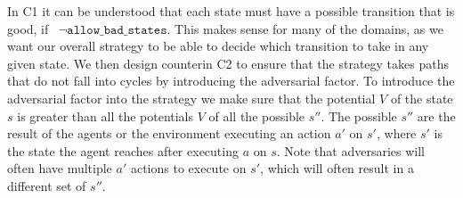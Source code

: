\documentclass[a4paper]{article}
\newcommand{\badtx}{\ensuremath{\mathrm{BAD}}}
\begin{document}
In C1 it can be understood that each state must have a possible transition that is good, if ~$\neg\texttt{allow\_bad\_states}$. This makes sense for many of the domains, as we want our overall strategy to be able to decide which transition to take in any given state. We then design counterin C2 to ensure that the strategy takes paths that do not fall into cycles by introducing the adversarial factor. To introduce the adversarial factor into the strategy we make sure that the potential $V$ of the state $s$ is greater than all the potentials $V$ of all the possible $s''$. The possible $s''$ are the result of the agents or the environment executing an action $a'$ on $s'$, where $s'$ is the state the agent reaches after executing $a$ on $s$. Note that adversaries will often have multiple $a'$ actions to execute on $s'$, which will often result in a different set of $s''$.

\pagebreak






\end{document}
